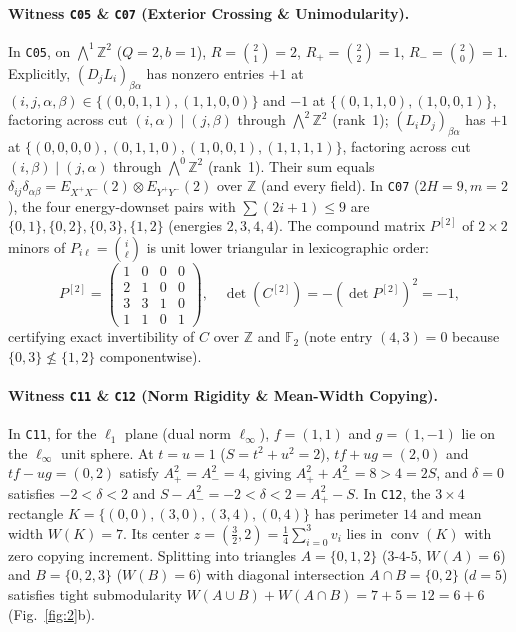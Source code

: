 \documentclass[10pt,twocolumn]{article}
\begin{document}
\paragraph{Witness \texttt{C05} \& \texttt{C07} (Exterior Crossing \& Unimodularity).}
In \texttt{C05}, on $\bigwedge^1 \mathbb{Z}^2$ ($Q=2, b=1$), $R=\binom{2}{1}=2$, $R_+=\binom{2}{2}=1$, $R_-=\binom{2}{0}=1$. Explicitly, $(D_j L_i)_{\beta\alpha}$ has nonzero entries $+1$ at $(i,j,\alpha,\beta)\in\{(0,0,1,1),(1,1,0,0)\}$ and $-1$ at $\{(0,1,1,0),(1,0,0,1)\}$, factoring across cut $(i,\alpha)\mid(j,\beta)$ through $\bigwedge^2\mathbb{Z}^2$ (rank~1); $(L_i D_j)_{\beta\alpha}$ has $+1$ at $\{(0,0,0,0),(0,1,1,0),(1,0,0,1),(1,1,1,1)\}$, factoring across cut $(i,\beta)\mid(j,\alpha)$ through $\bigwedge^0\mathbb{Z}^2$ (rank~1). Their sum equals $\delta_{ij}\delta_{\alpha\beta} = E_{X^+X^-}(2)\otimes E_{Y^+Y^-}(2)$ over $\mathbb{Z}$ (and every field). In \texttt{C07} ($2H=9, m=2$), the four energy-downset pairs with $\sum(2i+1)\le 9$ are $\{0,1\},\{0,2\},\{0,3\},\{1,2\}$ (energies $2,3,4,4$). The compound matrix $P^{[2]}$ of $2\times 2$ minors of $P_{i\ell}=\binom{i}{\ell}$ is unit lower triangular in lexicographic order:
\[
P^{[2]} = \begin{pmatrix} 1 & 0 & 0 & 0 \\ 2 & 1 & 0 & 0 \\ 3 & 3 & 1 & 0 \\ 1 & 1 & 0 & 1 \end{pmatrix}, \quad \det(C^{[2]}) = -(\det P^{[2]})^2 = -1,
\]
certifying exact invertibility of $C$ over $\mathbb{Z}$ and $\mathbb{F}_2$ (note entry $(4,3)=0$ because $\{0,3\}\not\le\{1,2\}$ componentwise).

\paragraph{Witness \texttt{C11} \& \texttt{C12} (Norm Rigidity \& Mean-Width Copying).}
In \texttt{C11}, for the $\ell_1$ plane (dual norm $\ell_\infty$), $f=(1,1)$ and $g=(1,-1)$ lie on the $\ell_\infty$ unit sphere. At $t=u=1$ ($S=t^2+u^2=2$), $tf+ug=(2,0)$ and $tf-ug=(0,2)$ satisfy $A_+^2 = A_-^2 = 4$, giving $A_+^2+A_-^2 = 8 > 4 = 2S$, and $\delta=0$ satisfies $-2 < \delta < 2$ and $S-A_-^2 = -2 < \delta < 2 = A_+^2-S$. In \texttt{C12}, the $3\times 4$ rectangle $K=\{(0,0),(3,0),(3,4),(0,4)\}$ has perimeter $14$ and mean width $W(K)=7$. Its center $z=(\frac{3}{2},2) = \frac{1}{4}\sum_{i=0}^3 v_i$ lies in $\operatorname{conv}(K)$ with zero copying increment. Splitting into triangles $A=\{0,1,2\}$ ($3$-$4$-$5$, $W(A)=6$) and $B=\{0,2,3\}$ ($W(B)=6$) with diagonal intersection $A\cap B=\{0,2\}$ ($d=5$) satisfies tight submodularity $W(A\cup B)+W(A\cap B) = 7+5 = 12 = 6+6$ (Fig.~\ref{fig:2}b).
\end{document}

